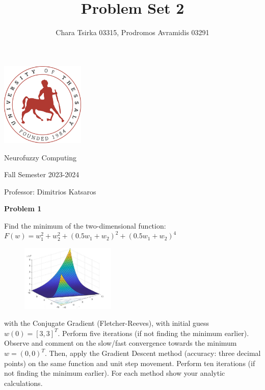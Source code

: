 \documentclass{article}
\title{\Huge Problem Set 2}
\author {\Large Chara Tsirka 03315, Prodromos Avramidis 03291}
\begin{document}
\maketitle
\begin{center}
\vspace{1cm}
\includegraphics[width=0.3\textwidth]{uthlogo.png}
\vspace{2cm}
\end{center}
\begin{center}
  \Huge Neurofuzzy Computing \vspace{1cm}

  \Large Fall Semester 2023-2024 \vspace{1cm}

  \Large Professor: Dimitrios Katsaros
\end{center}


\newpage
\noindent \textbf{Problem 1}

\noindent Find the minimum of the two-dimensional function: $F(w) = w_1^2+w_2^2+(0.5w_1+w_2)^2+(0.5w_1+w_2)^4$
\\ 

\begin{figure}[h]
  \centering
  \includegraphics[width=0.4\textwidth]{pr1_a.png}
  
\end{figure}

\noindent with the Conjugate Gradient (Fletcher-Reeves), with initial guess $w(0)= [3, 3]^T$. Perform 
five iterations (if not finding the minimum earlier). Observe and comment on the 
slow/fast convergence towards the minimum $w=(0, 0)^T$. Then, apply the Gradient 
Descent method (accuracy: three decimal points) on the same function and unit step
movement. Perform ten iterations (if not finding the minimum earlier). For each method 
show your analytic calculations. \\ \\ \\
\end{document}
